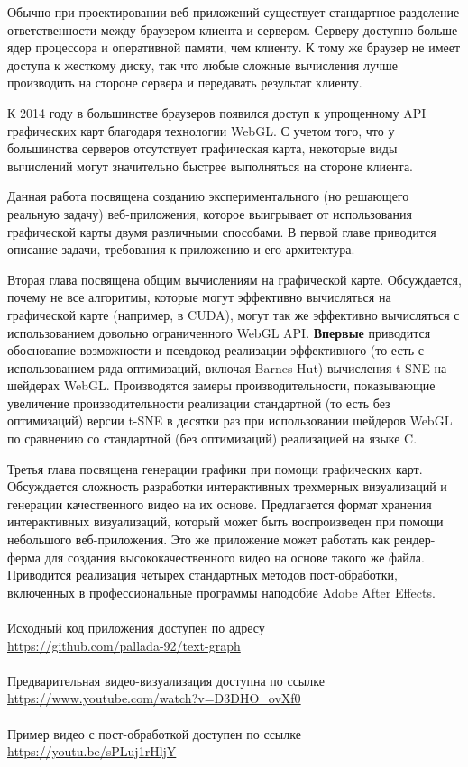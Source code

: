 Обычно при проектировании веб-приложений существует стандартное разделение ответственности между браузером клиента и сервером. Серверу доступно больше ядер процессора и оперативной памяти, чем клиенту. К тому же браузер не имеет доступа к жесткому диску, так что любые сложные вычисления лучше производить на стороне сервера и передавать результат клиенту.

К 2014 году в большинстве браузеров появился доступ к упрощенному API графических карт благодаря технологии WebGL. С учетом того, что у большинства серверов отсутствует графическая карта, некоторые виды вычислений могут значительно быстрее выполняться на стороне клиента.

Данная работа посвящена созданию экспериментального (но решающего реальную задачу) веб-приложения, которое выигрывает от использования графической карты двумя различными способами. В первой главе приводится описание задачи, требования к приложению и его архитектура.

Вторая глава посвящена общим вычислениям на графической карте. Обсуждается, почему не все алгоритмы, которые могут эффективно вычисляться на графической карте (например, в CUDA), могут так же эффективно вычисляться с использованием довольно ограниченного WebGL API. {\bfseries Впервые} приводится обоснование возможности и псевдокод реализации эффективного (то есть с использованием ряда оптимизаций, включая Barnes-Hut) вычисления t-SNE на шейдерах WebGL. Производятся замеры производительности, показывающие увеличение производительности реализации стандартной (то есть без оптимизаций) версии t-SNE в десятки раз при использовании шейдеров WebGL по сравнению со стандартной (без оптимизаций) реализацией на языке C.

Третья глава посвящена генерации графики при помощи графических карт. Обсуждается сложность разработки интерактивных трехмерных визуализаций и генерации качественного видео на их основе. Предлагается формат хранения интерактивных визуализаций, который может быть воспроизведен при помощи небольшого веб-приложения. Это же приложение может работать как рендер-ферма для создания высококачественного видео на основе такого же файла. Приводится реализация четырех стандартных методов пост-обработки, включенных в профессиональные программы наподобие Adobe After Effects.
\\
\\
Исходный код приложения доступен по адресу\\
\url{https://github.com/pallada-92/text-graph}\\
\\
Предварительная видео-визуализация доступна по ссылке\\
\url{https://www.youtube.com/watch?v=D3DHO_ovXf0}\\
\\
Пример видео с пост-обработкой доступен по ссылке\\
\url{https://youtu.be/sPLuj1rHljY}\\


